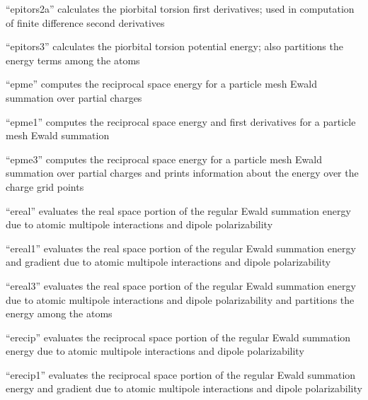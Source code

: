 \documentclass[letterpaper,11pt,english]{sphinxmanual}
\begin{document}
“epitors2a” calculates the pi\sphinxhyphen{}orbital torsion first derivatives; used in computation of finite difference second derivatives


“epitors3” calculates the pi\sphinxhyphen{}orbital torsion potential energy; also partitions the energy terms among the atoms


“epme” computes the reciprocal space energy for a particle mesh Ewald summation over partial charges


“epme1” computes the reciprocal space energy and first derivatives for a particle mesh Ewald summation


“epme3” computes the reciprocal space energy for a particle mesh Ewald summation over partial charges and prints information about the energy over the charge grid points



“ereal” evaluates the real space portion of the regular Ewald summation energy due to atomic multipole interactions and dipole polarizability


“ereal1” evaluates the real space portion of the regular Ewald summation energy and gradient due to atomic multipole interactions and dipole polarizability


“ereal3” evaluates the real space portion of the regular Ewald summation energy due to atomic multipole interactions and dipole polarizability and partitions the energy among the atoms


“erecip” evaluates the reciprocal space portion of the regular Ewald summation energy due to atomic multipole interactions and dipole polarizability


“erecip1” evaluates the reciprocal space portion of the regular Ewald summation energy and gradient due to atomic multipole interactions and dipole polarizability
\end{document}

